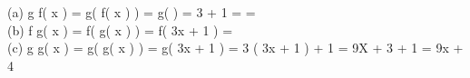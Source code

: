  \\

  \\

(a) \mspace{9mu} g \circ f\left( x \right) = g\left( f\left( x \right) \right) = g\left( \right) = 3 \cdot {} + 1 = =  \\

(b) \mspace{9mu} f \circ g\left( x \right) = f\left( g\left( x \right) \right) = f\left( 3x + 1 \right) =  \\

(c) \mspace{9mu} g \circ g\left( x \right) = g\left( g\left( x \right) \right) = g\left( 3x + 1 \right) = 3 \cdot \left( 3x + 1 \right) + 1 = 9X + 3 + 1 = 9x + 4 \\

